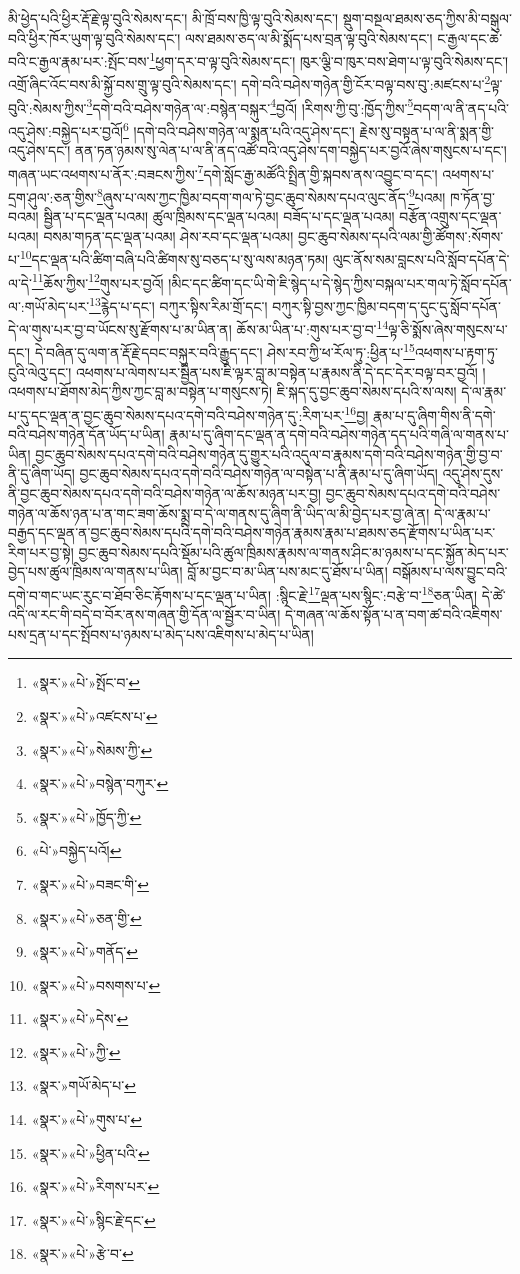 མི་ཕྱེད་པའི་ཕྱིར་རྡོ་རྗེ་ལྟ་བུའི་སེམས་དང་། མི་ཁྲོ་བས་ཁྱི་ལྟ་བུའི་སེམས་དང་། སྡུག་བསྔལ་ཐམས་ཅད་ཀྱིས་མི་བསྒུལ་བའི་ཕྱིར་ཁོར་ཡུག་ལྟ་བུའི་སེམས་དང་། ལས་ཐམས་ཅད་ལ་མི་སྨོད་པས་བྲན་ལྟ་བུའི་སེམས་དང་། ང་རྒྱལ་དང་ཆེ་བའི་ང་རྒྱལ་རྣམ་པར་:སྤོང་བས་\footnote{«སྣར་»«པེ་»སྤོང་བ་}ཕྱག་དར་བ་ལྟ་བུའི་སེམས་དང་། ཁུར་ལྕི་བ་ཁུར་བས་ཐེག་པ་ལྟ་བུའི་སེམས་དང་། འགྲོ་ཞིང་འོང་བས་མི་སྐྱོ་བས་གྲུ་ལྟ་བུའི་སེམས་དང་། དགེ་བའི་བཤེས་གཉེན་གྱི་ངོར་བལྟ་བས་བུ་:མཛངས་པ་\footnote{«སྣར་»«པེ་»འཛངས་པ་}ལྟ་བུའི་:སེམས་ཀྱིས་\footnote{«སྣར་»«པེ་»སེམས་ཀྱི་}དགེ་བའི་བཤེས་གཉེན་ལ་:བསྙེན་བསྐུར་\footnote{«སྣར་»«པེ་»བསྙེན་བཀུར་}བྱའོ། །རིགས་ཀྱི་བུ་:ཁྱོད་ཀྱིས་\footnote{«སྣར་»«པེ་»ཁྱོད་ཀྱི་}བདག་ལ་ནི་ནད་པའི་འདུ་ཤེས་:བསྐྱེད་པར་བྱའོ།\footnote{«པེ་»བསྐྱེད་པའོ།} །དགེ་བའི་བཤེས་གཉེན་ལ་སྨན་པའི་འདུ་ཤེས་དང་། རྗེས་སུ་བསྟན་པ་ལ་ནི་སྨན་གྱི་འདུ་ཤེས་དང་། ནན་ཏན་ཉམས་སུ་ལེན་པ་ལ་ནི་ནད་འཚོ་བའི་འདུ་ཤེས་དག་བསྐྱེད་པར་བྱའོ་ཞེས་གསུངས་པ་དང་། གཞན་ཡང་འཕགས་པ་ནོར་:བཟངས་ཀྱིས་\footnote{«སྣར་»«པེ་»བཟང་གི་}དགེ་སློང་རྒྱ་མཚོའི་སྤྲིན་གྱི་སྐབས་ནས་འབྱུང་བ་དང་། འཕགས་པ་དྲག་ཤུལ་:ཅན་གྱིས་\footnote{«སྣར་»«པེ་»ཅན་གྱི་}ཞུས་པ་ལས་ཀྱང་ཁྱིམ་བདག་གལ་ཏེ་བྱང་ཆུབ་སེམས་དཔའ་ལུང་ནོད་\footnote{«སྣར་»«པེ་»གནོད་}པའམ། ཁ་ཏོན་བྱ་བའམ། སྦྱིན་པ་དང་ལྡན་པའམ། ཚུལ་ཁྲིམས་དང་ལྡན་པའམ། བཟོད་པ་དང་ལྡན་པའམ། བརྩོན་འགྲུས་དང་ལྡན་པའམ། བསམ་གཏན་དང་ལྡན་པའམ། ཤེས་རབ་དང་ལྡན་པའམ། བྱང་ཆུབ་སེམས་དཔའི་ལམ་གྱི་ཚོགས་:སོགས་པ་\footnote{«སྣར་»«པེ་»བསགས་པ་}དང་ལྡན་པའི་ཚིག་བཞི་པའི་ཚིགས་སུ་བཅད་པ་སུ་ལས་མཉན་ཏམ། ལུང་ནོས་སམ་བླངས་པའི་སློབ་དཔོན་དེ་ལ་དེ་\footnote{«སྣར་»«པེ་»དེས་}ཆོས་ཀྱིས་\footnote{«སྣར་»«པེ་»ཀྱི་}གུས་པར་བྱའོ། །མིང་དང་ཚིག་དང་ཡི་གེ་ཇི་སྙེད་པ་དེ་སྙེད་ཀྱིས་བསྐལ་པར་གལ་ཏེ་སློབ་དཔོན་ལ་:གཡོ་མེད་པར་\footnote{«སྣར་»གཡོ་མེད་པ་}རྙེད་པ་དང་། བཀུར་སྟིས་རིམ་གྲོ་དང་། བཀུར་སྟི་བྱས་ཀྱང་ཁྱིམ་བདག་ད་དུང་དུ་སློབ་དཔོན་དེ་ལ་གུས་པར་བྱ་བ་ཡོངས་སུ་རྫོགས་པ་མ་ཡིན་ན། ཆོས་མ་ཡིན་པ་:གུས་པར་བྱ་བ་\footnote{«སྣར་»«པེ་»གུས་པ་}ལྟ་ཅི་སྨོས་ཞེས་གསུངས་པ་དང་། དེ་བཞིན་དུ་ལག་ན་རྡོ་རྗེ་དབང་བསྐུར་བའི་རྒྱུད་དང་། ཤེས་རབ་ཀྱི་ཕ་རོལ་ཏུ་:ཕྱིན་པ་\footnote{«སྣར་»«པེ་»ཕྱིན་པའི་}འཕགས་པ་རྟག་ཏུ་ངུའི་ལེའུ་དང་། འཕགས་པ་ལེགས་པར་སྦྱིན་པས་ཇི་ལྟར་བླ་མ་བསྟེན་པ་རྣམས་ནི་དེ་དང་དེར་བལྟ་བར་བྱའོ། །འཕགས་པ་ཐོགས་མེད་ཀྱིས་ཀྱང་བླ་མ་བསྟེན་པ་གསུངས་ཏེ། ཇི་སྐད་དུ་བྱང་ཆུབ་སེམས་དཔའི་ས་ལས། དེ་ལ་རྣམ་པ་དུ་དང་ལྡན་ན་བྱང་ཆུབ་སེམས་དཔའ་དགེ་བའི་བཤེས་གཉེན་དུ་:རིག་པར་\footnote{«སྣར་»«པེ་»རིགས་པར་}བྱ། རྣམ་པ་དུ་ཞིག་གིས་ནི་དགེ་བའི་བཤེས་གཉེན་དོན་ཡོད་པ་ཡིན། རྣམ་པ་དུ་ཞིག་དང་ལྡན་ན་དགེ་བའི་བཤེས་གཉེན་དད་པའི་གཞི་ལ་གནས་པ་ཡིན། བྱང་ཆུབ་སེམས་དཔའ་དགེ་བའི་བཤེས་གཉེན་དུ་གྱུར་པའི་འདུལ་བ་རྣམས་དགེ་བའི་བཤེས་གཉེན་གྱི་བྱ་བ་ནི་དུ་ཞིག་ཡོད། བྱང་ཆུབ་སེམས་དཔའ་དགེ་བའི་བཤེས་གཉེན་ལ་བསྟེན་པ་ནི་རྣམ་པ་དུ་ཞིག་ཡོད། འདུ་ཤེས་དུས་ནི་བྱང་ཆུབ་སེམས་དཔའ་དགེ་བའི་བཤེས་གཉེན་ལ་ཆོས་མཉན་པར་བྱ། བྱང་ཆུབ་སེམས་དཔའ་དགེ་བའི་བཤེས་གཉེན་ལ་ཆོས་ཉན་པ་ན་གང་ཟག་ཆོས་སྨྲ་བ་དེ་ལ་གནས་དུ་ཞིག་ནི་ཡིད་ལ་མི་བྱེད་པར་བྱ་ཞེ་ན། དེ་ལ་རྣམ་པ་བརྒྱད་དང་ལྡན་ན་བྱང་ཆུབ་སེམས་དཔའི་དགེ་བའི་བཤེས་གཉེན་རྣམས་རྣམ་པ་ཐམས་ཅད་རྫོགས་པ་ཡིན་པར་རིག་པར་བྱ་སྟེ། བྱང་ཆུབ་སེམས་དཔའི་སྡོམ་པའི་ཚུལ་ཁྲིམས་རྣམས་ལ་གནས་ཤིང་མ་ཉམས་པ་དང་སྐྱོན་མེད་པར་བྱེད་པས་ཚུལ་ཁྲིམས་ལ་གནས་པ་ཡིན། བློ་མ་བྱང་བ་མ་ཡིན་པས་མང་དུ་ཐོས་པ་ཡིན། བསྒོམས་པ་ལས་བྱུང་བའི་དགེ་བ་གང་ཡང་རུང་བ་ཐོབ་ཅིང་རྟོགས་པ་དང་ལྡན་པ་ཡིན། :སྙིང་རྗེ་\footnote{«སྣར་»«པེ་»སྙིང་རྗེ་དང་}ལྡན་པས་སྙིང་:བརྩེ་བ་\footnote{«སྣར་»«པེ་»རྩེ་བ་}ཅན་ཡིན། དེ་ཚེ་འདི་ལ་རང་གི་བདེ་བ་བོར་ནས་གཞན་གྱི་དོན་ལ་སྦྱོར་བ་ཡིན། དེ་གཞན་ལ་ཆོས་སྟོན་པ་ན་བག་ཚ་བའི་འཇིགས་པས་དྲན་པ་དང་སྤོབས་པ་ཉམས་པ་མེད་པས་འཇིགས་པ་མེད་པ་ཡིན། 